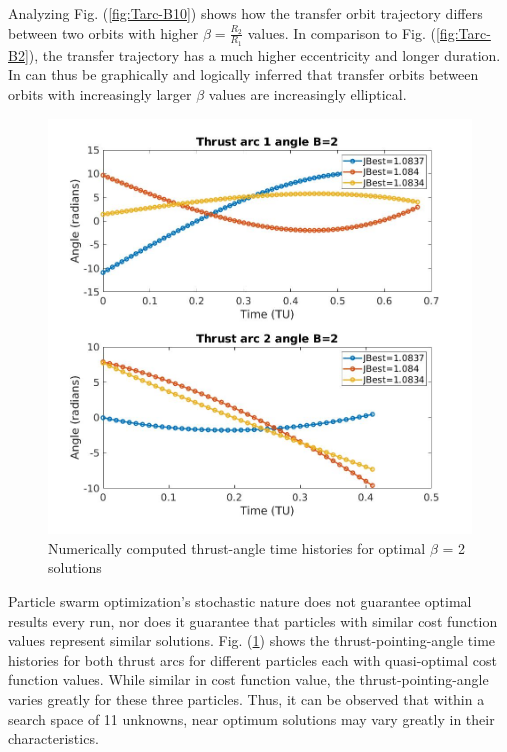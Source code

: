 \noindent Analyzing Fig. (\ref{fig:Tarc-B10}) shows how the transfer orbit trajectory differs between two orbits 
with higher $\beta = \frac{R_2}{R_1}$ values. In comparison to Fig. (\ref{fig:Tarc-B2}), the transfer trajectory has
a much higher eccentricity and longer duration. In can thus be graphically and logically inferred that transfer orbits between orbits 
with increasingly larger $\beta$ values are increasingly elliptical.

\begin{figure}[H]
\includegraphics[width=\linewidth]{./jpgs/thrustAnglesB2.jpg}
\caption{Numerically computed thrust-angle time histories for optimal $\beta$ = 2 solutions  }
\label{fig:thrustAnglesB2}
\end{figure}

\noindent Particle swarm optimization's stochastic nature does not guarantee optimal results every 
run, nor does it guarantee that particles with similar cost function values represent similar solutions. 
Fig. (\ref{fig:thrustAnglesB2}) shows the thrust-pointing-angle time histories for both thrust arcs for 
different particles each with quasi-optimal cost function values. While similar in cost function value, the 
thrust-pointing-angle varies greatly for these three particles. Thus, it can be observed that within a search 
space of 11 unknowns, near optimum solutions may vary greatly in their characteristics.

